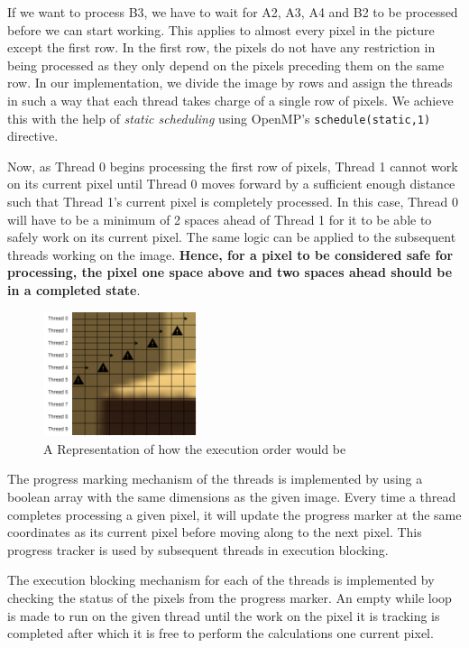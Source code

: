 \documentclass{article}
\begin{document}
\noindent If we want to process B3, we have to wait for A2, A3, A4 and B2 to be processed before we can start working. This applies to almost every pixel in the picture except the first row. In the first row, the pixels do not have any restriction in being processed as they only depend on the pixels preceding them on the same row. In our implementation, we divide the image by rows and assign the threads in such a way that each thread takes charge of a single row of pixels. We achieve this with the help of \textit{static scheduling} using OpenMP's \texttt{schedule(static,1)} directive.

\medskip
\noindent Now, as Thread 0 begins processing the first row of pixels, Thread 1 cannot work on its current pixel until Thread 0 moves forward by a sufficient enough distance such that Thread 1's current pixel is completely processed. In this case, Thread 0 will have to be a minimum of 2 spaces ahead of Thread 1 for it to be able to safely work on its current pixel. The same logic can be applied to the subsequent threads working on the image. \textbf{Hence, for a pixel to be considered safe for processing, the pixel one space above and two spaces ahead should be in a completed state}.

\begin{figure}[h]
    \centering
    \includegraphics[width=0.4\textwidth]{images/parallel_floyd2.png}
    \caption{A Representation of how the execution order would be}
    \label{fig:cornell_box2}
\end{figure}

\medskip
\noindent The progress marking\cite{Hartley} mechanism of the threads is implemented by using a boolean array with the same dimensions as the given image. Every time a thread completes processing a given pixel, it will update the progress marker at the same coordinates as its current pixel before moving along to the next pixel. This progress tracker is used by subsequent threads in execution blocking.

\medskip
\noindent The execution blocking mechanism for each of the threads is implemented by checking the status of the pixels from the progress marker. An empty while loop is made to run on the given thread until the work on the pixel it is tracking is completed after which it is free to perform the calculations one current pixel.
\end{document}
